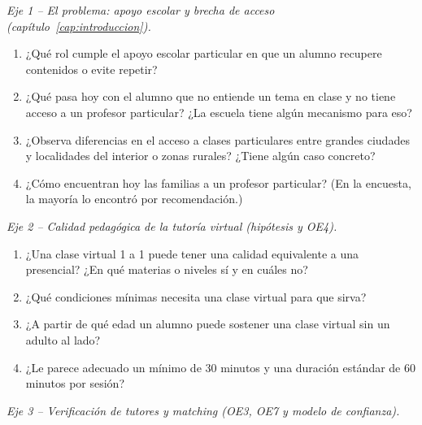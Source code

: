 \emph{Eje 1 -- El problema: apoyo escolar y brecha de acceso
(capítulo~\ref{cap:introduccion}).}

\begin{enumerate}
    \item ¿Qué rol cumple el apoyo escolar particular en que un alumno
          recupere contenidos o evite repetir?
    \item ¿Qué pasa hoy con el alumno que no entiende un tema en clase y
          no tiene acceso a un profesor particular? ¿La escuela tiene
          algún mecanismo para eso?
    \item ¿Observa diferencias en el acceso a clases particulares entre
          grandes ciudades y localidades del interior o zonas rurales?
          ¿Tiene algún caso concreto?
    \item ¿Cómo encuentran hoy las familias a un profesor particular?
          (En la encuesta, la mayoría lo encontró por recomendación.)
\end{enumerate}

\emph{Eje 2 -- Calidad pedagógica de la tutoría virtual (hipótesis y
OE4).}

\begin{enumerate}[resume]
    \item ¿Una clase virtual 1 a 1 puede tener una calidad equivalente a
          una presencial? ¿En qué materias o niveles sí y en cuáles no?
    \item ¿Qué condiciones mínimas necesita una clase virtual para que
          sirva?
    \item ¿A partir de qué edad un alumno puede sostener una clase virtual
          sin un adulto al lado?
    \item ¿Le parece adecuado un mínimo de 30 minutos y una duración
          estándar de 60 minutos por sesión?
\end{enumerate}

\emph{Eje 3 -- Verificación de tutores y \gls{matching} (OE3, OE7 y
modelo de confianza).}

